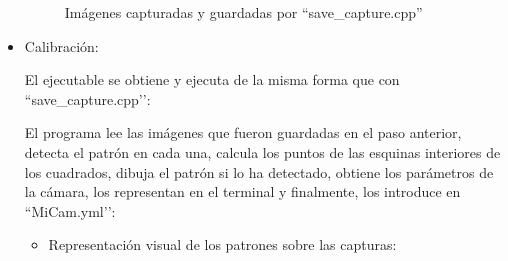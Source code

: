 \begin{itemize}
\begin{figure}[htbp]
\caption{Imágenes capturadas y guardadas por ``save\_capture.cpp''} 
\end{figure}

    \item Calibración:

El ejecutable se obtiene y ejecuta de la misma forma que con ``save\_capture.cpp’’: \\


El programa lee las imágenes que fueron guardadas en el paso anterior, detecta el patrón en cada una, calcula los puntos de las esquinas interiores de los cuadrados, dibuja el patrón si lo ha detectado, obtiene los parámetros de la cámara, los representan en el terminal y finalmente, los introduce en ``MiCam.yml’’:

\begin{itemize}
    \item Representación visual de los patrones sobre las capturas:\\
    

\end{itemize}
\end{itemize}
